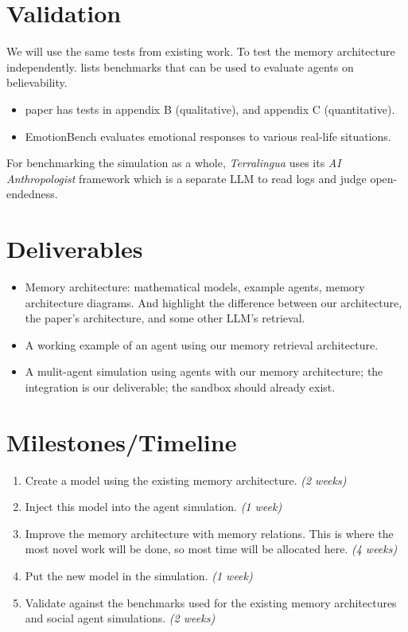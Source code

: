 \documentclass{article}
\begin{document}
\section{Validation}
We will use the same tests from existing work. To test the memory architecture independently.
\parencite{kuroki2026shachimodularcontrollableframework} lists benchmarks that can be used to evaluate agents on believability.
\begin{itemize}
    \item\textcite{hou2024humanrecall} paper has tests in appendix B (qualitative), and appendix C (quantitative).
    \item EmotionBench \parencite{huang2024emotionallynumbempatheticevaluating} evaluates emotional responses to various real-life situations.
\end{itemize}
For benchmarking the simulation as a whole, \textit{Terralingua} \parencite{paolo2026terralinguaemergenceanalysisopenendedness} uses its \textit{AI Anthropologist} framework which is a separate LLM to read logs and judge open-endedness.

\section{Deliverables}
\begin{itemize}
    \item Memory architecture: mathematical models, example agents, memory architecture diagrams.
        And highlight the difference between our architecture, the paper’s architecture, and some other LLM’s retrieval.
    \item A working example of an agent using our memory retrieval architecture.
    \item A mulit-agent simulation using agents with our memory architecture; the integration is our deliverable; the sandbox should already exist.
\end{itemize}

\section{Milestones/Timeline}
\begin{enumerate}
    \item Create a model using the existing memory architecture. \textit{(2 weeks)}
    \item Inject this model into the agent simulation. \textit{(1 week)}
    \item Improve the memory architecture with memory relations. This is where the most novel work will be done, so most time will be allocated here. \textit{(4 weeks)}
    \item Put the new model in the simulation. \textit{(1 week)}
    \item Validate against the benchmarks used for the existing memory architectures and social agent simulations. \textit{(2 weeks)}
\end{enumerate}
\end{document}
